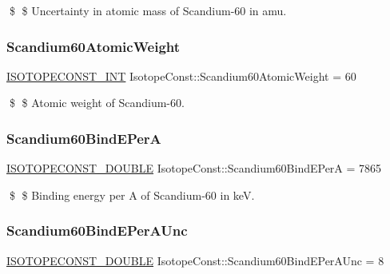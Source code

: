 \$ \$ Uncertainty in atomic mass of Scandium-\/60 in amu. \mbox{\label{group___isotope_const-_scandium-_sc60_ga312069def56ac2b767a5f6df70403dc0}} 
\subsubsection{\texorpdfstring{Scandium60\+Atomic\+Weight}{Scandium60AtomicWeight}}
{\footnotesize\ttfamily \mbox{\hyperlink{group___isotope_const-_macros_ga5f18360b3e99483a35c32d789e62621c}{I\+S\+O\+T\+O\+P\+E\+C\+O\+N\+S\+T\+\_\+\+I\+NT}} Isotope\+Const\+::\+Scandium60\+Atomic\+Weight = 60}

\$ \$ Atomic weight of Scandium-\/60. \mbox{\label{group___isotope_const-_scandium-_sc60_ga4690e6cc35fb84ac942d1e424b9b9c34}} 
\subsubsection{\texorpdfstring{Scandium60\+Bind\+E\+PerA}{Scandium60BindEPerA}}
{\footnotesize\ttfamily \mbox{\hyperlink{group___isotope_const-_macros_ga8f45a7272ce02c0b4c65c44636ed719a}{I\+S\+O\+T\+O\+P\+E\+C\+O\+N\+S\+T\+\_\+\+D\+O\+U\+B\+LE}} Isotope\+Const\+::\+Scandium60\+Bind\+E\+PerA = 7865}

\$ \$ Binding energy per A of Scandium-\/60 in keV. \mbox{\label{group___isotope_const-_scandium-_sc60_gaabb7b4617c9783fca12437e9fbb488d0}} 
\subsubsection{\texorpdfstring{Scandium60\+Bind\+E\+Per\+A\+Unc}{Scandium60BindEPerAUnc}}
{\footnotesize\ttfamily \mbox{\hyperlink{group___isotope_const-_macros_ga8f45a7272ce02c0b4c65c44636ed719a}{I\+S\+O\+T\+O\+P\+E\+C\+O\+N\+S\+T\+\_\+\+D\+O\+U\+B\+LE}} Isotope\+Const\+::\+Scandium60\+Bind\+E\+Per\+A\+Unc = 8}


